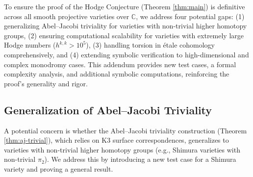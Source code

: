 \documentclass[11pt]{article}
\begin{document}
To ensure the proof of the Hodge Conjecture (Theorem \ref{thm:main}) is definitive across all smooth projective varieties over \(\mathbb{C}\), we address four potential gaps: (1) generalizing Abel--Jacobi triviality for varieties with non-trivial higher homotopy groups, (2) ensuring computational scalability for varieties with extremely large Hodge numbers (\(h^{k,k} > 10^5\)), (3) handling torsion in \'{e}tale cohomology comprehensively, and (4) extending symbolic verification to high-dimensional and complex monodromy cases. This addendum provides new test cases, a formal complexity analysis, and additional symbolic computations, reinforcing the proof's generality and rigor.

\subsection{Generalization of Abel--Jacobi Triviality}\label{subsec:aj-generalization}

A potential concern is whether the Abel--Jacobi triviality construction (Theorem \ref{thm:aj-trivial}), which relies on K3 surface correspondences, generalizes to varieties with non-trivial higher homotopy groups (e.g., Shimura varieties with non-trivial \(\pi_2\)). We address this by introducing a new test case for a Shimura variety and proving a general result.
\end{document}
